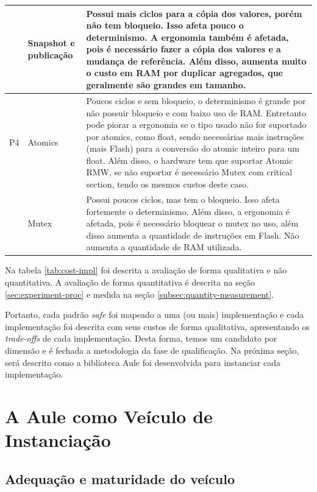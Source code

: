 \begin{longtable}{>{\raggedright\arraybackslash}p{} >{\raggedright\arraybackslash}p{} >{\raggedright\arraybackslash}p{}}
     & Snapshot e publicação & Possui mais ciclos para a cópia dos valores, porém não tem bloqueio. Isso afeta pouco o determinismo. A ergonomia também é afetada, pois é necessário fazer a cópia dos valores e a mudança de referência. Além disso, aumenta muito o custo em RAM por duplicar agregados, que geralmente são grandes em tamanho. \\
  \hline
  P4 & Atomics & Poucos ciclos e sem bloqueio, o determinismo é grande por não possuir bloqueio e com baixo uso de RAM. Entretanto pode piorar a ergonomia se o tipo usado não for suportado por atomics, como float, sendo necessárias mais instruções (mais Flash) para a conversão do atomic inteiro para um float. Além disso, o hardware tem que suportar Atomic RMW, se não suportar é necessário Mutex com critical section, tendo os mesmos custos deste caso. \\
     & Mutex & Possui poucos ciclos, mas tem o bloqueio. Isso afeta fortemente o determinismo. Além disso, a ergonomia é afetada, pois é necessário bloquear o mutex no uso, além disso aumenta a quantidade de instruções em Flash. Não aumenta a quantidade de RAM utilizada. \\
\end{longtable}

Na tabela \ref{tab:cost-impl} foi descrita a avaliação de forma qualitativa e não quantitativa. A avaliação de forma quantitativa é descrita na seção \ref{sec:experiment-proc} e medida na seção \ref{subsec:quantity-measurement}.

Portanto, cada padrão \textit{safe} foi mapeado a uma (ou mais) implementação e cada implementação foi descrita com seus custos de forma qualitativa, apresentando os \textit{trade-offs} de cada implementação. Desta forma, temos um candidato por dimensão e é fechada a metodologia da fase de qualificação. Na próxima seção, será descrito como a biblioteca Aule foi desenvolvida para instanciar cada implementação.

\section{A Aule como Veículo de Instanciação}
\label{sec:aule}

\subsection{Adequação e maturidade do veículo}
\label{subsec:aule-maturity}

